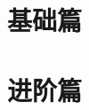 \documentclass[a4paper,openany]{book}
\begin{document}



\frontmatter

\tableofcontents

\mainmatter
\part{基础篇}







\part{进阶篇}



% 
\end{document}

